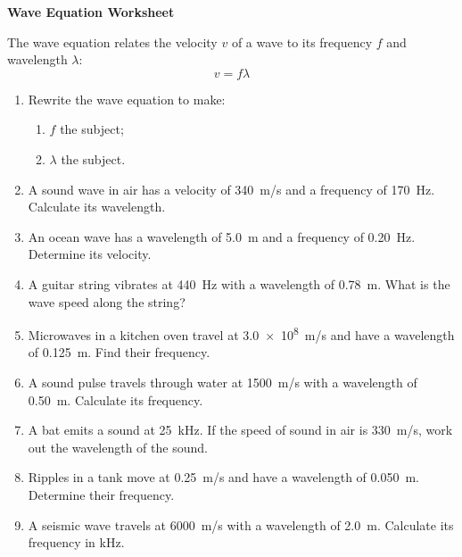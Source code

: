 \documentclass[12pt]{article}
\begin{document}
\begin{center}
    {\LARGE \textbf{Wave Equation Worksheet}}\\
    \vspace{0.5em}
\end{center}

\bigskip

The wave equation relates the velocity \(v\) of a wave to its frequency \(f\) and wavelength \(\lambda\):
\[
    v = f \lambda
\]

\begin{enumerate}
    \item[\textbf{1.}] Rewrite the wave equation to make:
        \begin{enumerate}
            \item \(f\) the subject;
            \item \(\lambda\) the subject.
        \end{enumerate}

    \item[\textbf{2.}] A sound wave in air has a velocity of \SI{340}{m/s} and a frequency of \SI{170}{Hz}. Calculate its wavelength.

    \item[\textbf{3.}] An ocean wave has a wavelength of \SI{5.0}{m} and a frequency of \SI{0.20}{Hz}. Determine its velocity.

    \item[\textbf{4.}] A guitar string vibrates at \SI{440}{Hz} with a wavelength of \SI{0.78}{m}. What is the wave speed along the string?

    \item[\textbf{5.}] Microwaves in a kitchen oven travel at \SI{3.0e8}{m/s} and have a wavelength of \SI{0.125}{m}. Find their frequency.

    \item[\textbf{6.}] A sound pulse travels through water at \SI{1500}{m/s} with a wavelength of \SI{0.50}{m}. Calculate its frequency.

    \item[\textbf{7.}] A bat emits a sound at \SI{25}{kHz}. If the speed of sound in air is \SI{330}{m/s}, work out the wavelength of the sound.

    \item[\textbf{8.}] Ripples in a tank move at \SI{0.25}{m/s} and have a wavelength of \SI{0.050}{m}. Determine their frequency.

    \item[\textbf{9.}] A seismic wave travels at \SI{6000}{m/s} with a wavelength of \SI{2.0}{m}. Calculate its frequency in \si{kHz}.


\end{enumerate}
\end{document}
